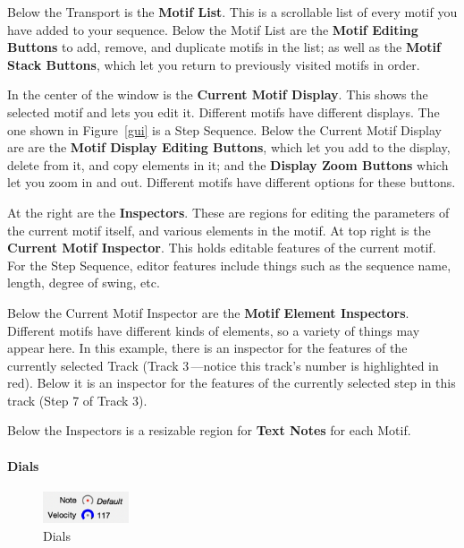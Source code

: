 \documentclass[twoside,10pt]{article}
\begin{document}
Below the Transport is the {\bf Motif List}.  This is a scrollable list of every motif you have added to your sequence.  Below the Motif List are the {\bf Motif Editing Buttons} to add, remove, and duplicate motifs in the list; as well as the {\bf Motif Stack Buttons}, which let you return to previously visited motifs in order.

In the center of the window is the {\bf Current Motif Display}.  This shows the selected motif and lets you edit it.  Different motifs have different displays.  The one shown in Figure~\ref{gui} is a Step Sequence.  Below the Current Motif Display are are the {\bf Motif Display Editing Buttons}, which let you add to the display, delete from it, and copy elements in it; and the {\bf Display Zoom Buttons} which let you zoom in and out.  Different motifs have different options for these buttons.

At the right are the {\bf Inspectors}.  These are regions for editing the parameters of the current motif itself, and various elements in the motif.  At top right is the {\bf Current Motif Inspector}.  This holds editable features of the current motif.  For the Step Sequence, editor features include things such as the sequence name, length, degree of swing, etc.

Below the Current Motif Inspector are the {\bf Motif Element Inspectors}.  Different motifs have different kinds of elements, so a variety of things may appear here.  In this example, there is an inspector for the features of the currently selected Track (Track 3\,---notice this track's number is highlighted in red).  Below it is an inspector for the features of the currently selected step in this track (Step 7 of Track 3).  

Below the Inspectors is a resizable region for {\bf Text Notes} for each Motif.

\paragraph{Dials}

\begin{figure}
\includegraphics[width=1in]{smalldials}
\vspace{-2em}
\caption{Dials}
\label{dials}
\vspace{-1em}
\end{figure}
\end{document}
